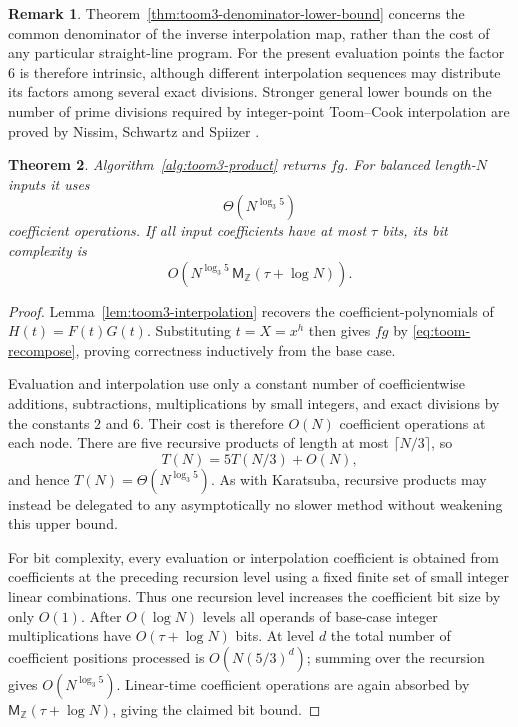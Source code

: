 \documentclass[11pt]{book}
\newtheorem{theorem}{Theorem}[section]
\theoremstyle{definition}
\newtheorem{remark}[theorem]{Remark}
\newcommand{\ZZ}{\mathbb Z}
\newcommand{\MZ}{\mathsf M_{\ZZ}}
\begin{document}
\begin{remark}
Theorem~\ref{thm:toom3-denominator-lower-bound} concerns the common
denominator of the inverse interpolation map, rather than the cost of any
particular straight-line program.  For the present evaluation points the
factor $6$ is therefore intrinsic, although different interpolation sequences
may distribute its factors among several exact divisions.  Stronger general
lower bounds on the number of prime divisions required by integer-point
Toom--Cook interpolation are proved by Nissim, Schwartz and Spiizer
\cite{NissimSchwartzSpiizer2026}.
\end{remark}

\begin{theorem}\label{thm:toom3-correctness-complexity}
Algorithm~\ref{alg:toom3-product} returns $fg$.  For balanced length-$N$
inputs it uses
\[
 \Theta\!\left(N^{\log_3 5}\right)
\]
coefficient operations.  If all input coefficients have at most $\tau$ bits,
its bit complexity is
\[
 O\!\left(
 N^{\log_3 5}\,\MZ(\tau+\log N)
 \right).
\]
\end{theorem}

\begin{proof}
Lemma~\ref{lem:toom3-interpolation} recovers the coefficient-polynomials of
$H(t)=F(t)G(t)$.  Substituting $t=X=x^h$ then gives $fg$ by
\eqref{eq:toom-recompose}, proving correctness inductively from the base case.

Evaluation and interpolation use only a constant number of coefficientwise
additions, subtractions, multiplications by small integers, and exact divisions
by the constants $2$ and $6$.  Their cost is therefore $O(N)$ coefficient
operations at each node.  There are five recursive products of length at most
$\lceil N/3\rceil$, so
\[
 T(N)=5T(N/3)+O(N),
\]
and hence $T(N)=\Theta(N^{\log_3 5})$.  As with Karatsuba, recursive
products may instead be delegated to any asymptotically no slower method
without weakening this upper bound.

For bit complexity, every evaluation or interpolation coefficient is obtained
from coefficients at the preceding recursion level using a fixed finite set of
small integer linear combinations.  Thus one recursion level increases the
coefficient bit size by only $O(1)$.  After $O(\log N)$ levels all operands of
base-case integer multiplications have $O(\tau+\log N)$ bits.
At level $d$ the total number of coefficient positions processed is
$O(N(5/3)^d)$; summing over the recursion gives
$O(N^{\log_3 5})$.  Linear-time coefficient operations are again absorbed by
$\MZ(\tau+\log N)$, giving the claimed bit bound.
\end{proof}
\end{document}
